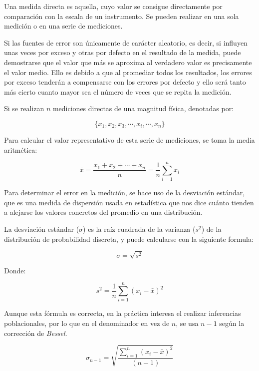 \documentclass[letter,11pt]{article}
\begin{document}
Una medida directa es aquella, cuyo valor se consigue directamente por
comparación con la escala de un instrumento. Se pueden realizar en una sola
medición o en una serie de mediciones.

Si las fuentes de error son únicamente de carácter aleatorio, es decir, si
influyen unas veces por exceso y otras por defecto en el resultado de la medida,
puede demostrarse que el valor que más se aproxima al verdadero valor es
precisamente el valor medio. Ello es debido a que al promediar todos los
resultados, los errores por exceso tenderán a compensarse con los errores por
defecto y ello será tanto más cierto cuanto mayor sea el número de veces que se
repita la medición.

Si se realizan $n$ mediciones directas de una magnitud física, denotadas
por:

\begin{equation}
    \{x_1,x_2,x_3,\cdots,x_i,\cdots,x_n\}
\end{equation}

Para calcular el valor representativo de esta serie de mediciones, se toma la
media aritmética:

\begin{equation}
    \bar{x} = \frac{x_1+x_2+\cdots+x_n}{n} = \frac{1}{n}\sum_{i=1}^{n} x_i
\end{equation}

Para determinar el error en la medición, se hace uso de la desviación estándar,
que es una medida de dispersión usada en estadística que nos dice cuánto tienden
a alejarse los valores concretos del promedio en una distribución.

La desviación estándar ($\sigma$) es la raíz cuadrada de la varianza ($s^2$) de
la distribución de probabilidad discreta, y puede calcularse con la siguiente
formula:

\begin{equation}
    \sigma = \sqrt{s^2}
\end{equation}

Donde:

\begin{equation}
    s^2 = \frac{1}{n}\sum_{i=1}^{n} (x_i-\bar{x})^2
\end{equation}

Aunque esta fórmula es correcta, en la práctica interesa el realizar inferencias
poblacionales, por lo que en el denominador en vez de $n$, se usa $n-1$ según la
corrección de \emph{Bessel}.

\begin{equation}
    \sigma_{n-1} = \sqrt{\frac{\sum_{i=1}^{n} (x_i-\bar{x})^2}{(n-1)}}
\end{equation}
\end{document}
